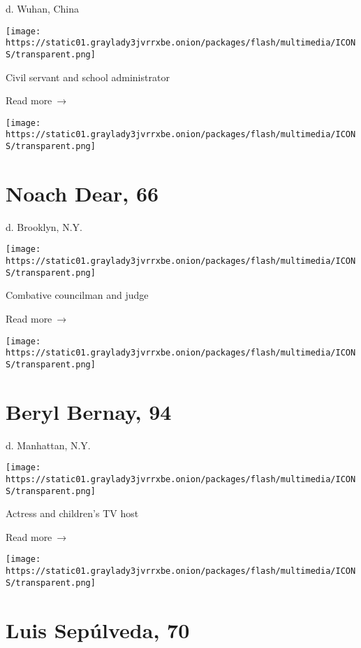 d. Wuhan, China

\texttt{[image: https://static01.graylady3jvrrxbe.onion/packages/flash/multimedia/ICONS/transparent.png]}

Civil servant and school administrator

 Read more~→

\href{https://www.nytimes3xbfgragh.onion/2020/04/20/obituaries/noach-dear-dead-coronavirus.html}{}

\texttt{[image: https://static01.graylady3jvrrxbe.onion/packages/flash/multimedia/ICONS/transparent.png]}

\hypertarget{noach-dear-66}{%
\section{Noach Dear, 66}\label{noach-dear-66}}

d. Brooklyn, N.Y.

\texttt{[image: https://static01.graylady3jvrrxbe.onion/packages/flash/multimedia/ICONS/transparent.png]}

Combative councilman and judge

 Read more~→

\href{https://www.nytimes3xbfgragh.onion/2020/04/20/obituaries/beryl-bernay-dead-coronavirus.html}{}

\texttt{[image: https://static01.graylady3jvrrxbe.onion/packages/flash/multimedia/ICONS/transparent.png]}

\hypertarget{beryl-bernay-94}{%
\section{Beryl Bernay, 94}\label{beryl-bernay-94}}

d. Manhattan, N.Y.

\texttt{[image: https://static01.graylady3jvrrxbe.onion/packages/flash/multimedia/ICONS/transparent.png]}

Actress and children's TV host

 Read more~→

\href{https://www.nytimes3xbfgragh.onion/2020/04/20/obituaries/luis-sepulveda-dead-coronavirus.html}{}

\texttt{[image: https://static01.graylady3jvrrxbe.onion/packages/flash/multimedia/ICONS/transparent.png]}

\hypertarget{luis-sepuxfalveda-70}{%
\section{Luis Sepúlveda, 70}\label{luis-sepuxfalveda-70}}

